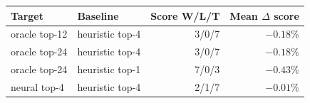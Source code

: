 \begin{tabular}{llrr}
\toprule
Target & Baseline & Score W/L/T & Mean $\Delta$ score \\
\midrule
oracle top-12 & heuristic top-4 & 3/0/7 & $-0.18\%$ \\
oracle top-24 & heuristic top-4 & 3/0/7 & $-0.18\%$ \\
oracle top-24 & heuristic top-1 & 7/0/3 & $-0.43\%$ \\
neural top-4 & heuristic top-4 & 2/1/7 & $-0.01\%$ \\
\bottomrule
\end{tabular}
